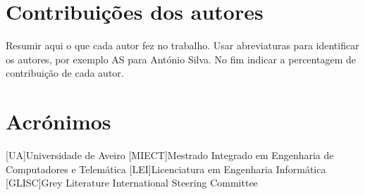 \documentclass{report}
\begin{document}
\chapter*{Contribuições dos autores}
Resumir aqui o que cada autor fez no trabalho.
Usar abreviaturas para identificar os autores,
por exemplo AS para António Silva.
No fim indicar a percentagem de contribuição de cada autor.

\chapter*{Acrónimos}
\begin{acronym}
[UA]{Universidade de Aveiro}
[MIECT]{Mestrado Integrado em Engenharia de Computadores e Telemática}
[LEI]{Licenciatura em Engenharia Informática}
[GLISC]{Grey Literature International Steering Committee}
\end{acronym}


\printbibliography
\end{document}
